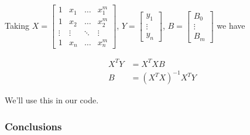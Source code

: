 Taking
$X = \begin{bmatrix}
		1      & x_1    & \dots  & x_1^m  \\
		1      & x_2    & \dots  & x_2^m  \\
		\vdots & \vdots & \ddots & \vdots \\
		1      & x_n    & \dots  & x_n^m
	\end{bmatrix}$,
$Y = \begin{bmatrix}
		y_1 \\ \vdots \\ y_n
	\end{bmatrix}$,
$B = \begin{bmatrix}
		B_0 \\ \vdots \\ B_m
	\end{bmatrix}$
we have

\begin{align}
	X^TY & = X^TXB           \\
	B    & = (X^TX)^{-1}X^TY
\end{align}

We'll use this in our code.

\subsubsection{Conclusions}

